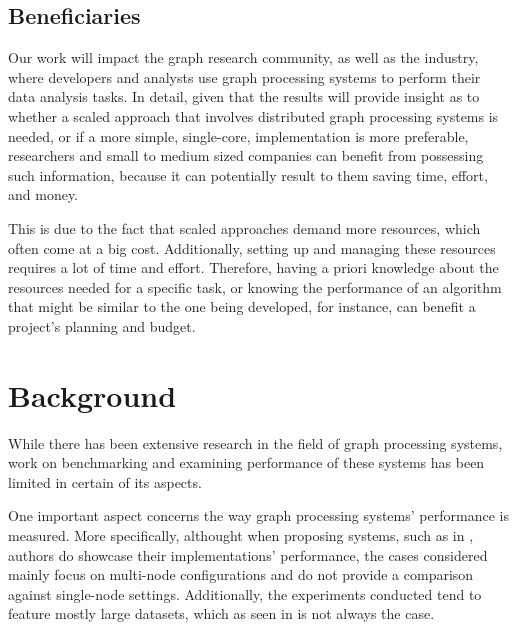 \documentclass[a4paper,11pt]{article}
\begin{document}

\subsection{Beneficiaries}

\par Our work will impact the graph research community, as well as the industry, where developers and analysts use graph processing systems to perform their data analysis tasks. In detail, given that the results will provide insight as to whether a scaled approach that involves distributed graph processing systems is needed, or if a more simple, single-core, implementation is more preferable, researchers and small to medium sized companies can benefit from possessing such information, because it can potentially result to them saving time, effort, and money. 

\par This is due to the fact that scaled approaches demand more resources, which often come at a big cost. Additionally, setting up and managing these resources requires a lot of time and effort. Therefore, having a priori knowledge about the resources needed for a specific task, or knowing the performance of an algorithm that might be similar to the one being developed, for instance, can benefit a project's planning and budget.





\section{Background} \label{background}

\par While there has been extensive research in the field of graph processing systems, work on benchmarking and examining performance of these systems has been limited in certain of its aspects. 

\par One important aspect concerns the way graph processing systems' performance is measured. More specifically, althought when proposing systems, such as in \cite{pregel,graphxpaper, powergraph}, authors do showcase their implementations' performance, the cases considered mainly focus on multi-node configurations and do not provide a comparison against single-node settings. Additionally, the experiments conducted tend to feature mostly large datasets, which as seen in \cite{survey} is not always the case.
\end{document}
